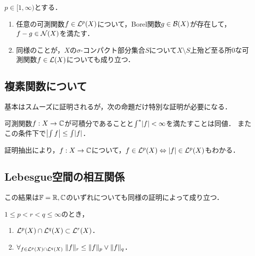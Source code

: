 \documentclass[uplatex,dvipdfmx]{jsreport}
\begin{document}
\begin{proposition}
    $p\in[1,\infty)$とする．
    \begin{enumerate}
        \item 任意の可測関数$f\in\mathcal{L}^p(X)$について，Borel関数$g\in\mathcal{B}(X)$が存在して，$f-g\in\mathcal{N}(X)$を満たす．
        \item 同様のことが，$X$の$\sigma$-コンパクト部分集合$S$について$X\setminus S$上殆ど至る所$0$な可測関数$f\in\mathcal{L}(X)$についても成り立つ．
    \end{enumerate}
\end{proposition}

\subsection{複素関数について}

\begin{tcolorbox}[colframe=ForestGreen, colback=ForestGreen!10!white,breakable,colbacktitle=ForestGreen!40!white,coltitle=black,fonttitle=\bfseries\sffamily,
title=]
    基本はスムーズに証明されるが，次の命題だけ特別な証明が必要になる．
\end{tcolorbox}

\begin{proposition}
    可測関数$f:X\to\mathbb{C}$が可積分であることと$\int^*\lvert f\rvert<\infty$を満たすことは同値．
    またこの条件下で$\left|\int f\right|\le\int\lvert f\rvert$．
\end{proposition}
\begin{remarks}
    証明抽出により，$f:X\to\mathbb{C}$について，$f\in\mathcal{L}^p(X)\Leftrightarrow\lvert f\rvert\in\mathcal{L}^p(X)$もわかる．
\end{remarks}

\subsection{Lebesgue空間の相互関係}

\begin{tcolorbox}[colframe=ForestGreen, colback=ForestGreen!10!white,breakable,colbacktitle=ForestGreen!40!white,coltitle=black,fonttitle=\bfseries\sffamily,
title=]
    この結果は$\mathbb{F}=\mathbb{R},\mathbb{C}$のいずれについても同様の証明によって成り立つ．
\end{tcolorbox}

\begin{proposition}
    $1\le p<r<q\le\infty$のとき，
    \begin{enumerate}
        \item $\mathcal{L}^p(X)\cap\mathcal{L}^q(X)\subset\mathcal{L}^r(X)$．
        \item $\forall_{f\in\mathcal{L}^p(X)\cap\mathcal{L}^q(X)}\;\|f\|_r\le\|f\|_p\lor\|f\|_q$．
    \end{enumerate}
\end{proposition}
\end{document}
